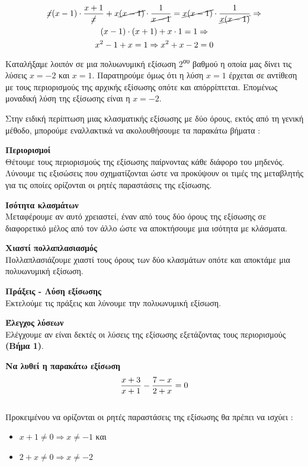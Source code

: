 \documentclass[twoside,nofonts,internet,methodoi]{thewria}
\DeclareRobustCommand{\frac}[3][0pt]{%
{\begingroup\hspace{#1}#2\hspace{#1}\endgroup\over\hspace{#1}#3\hspace{#1}}}
\newcommand{\tss}[1]{\textsuperscript{#1}}
\begin{document}
\begin{gather*}
\cancel{x}(x-1)\cdot\frac{x+1}{\cancel{x}}+x\cancel{(x-1)}\cdot\frac{1}{\cancel{x-1}}=\cancel{x(x-1)}\cdot\frac{1}{\cancel{x(x-1)}}\Rightarrow\\
(x-1)\cdot\left( x+1\right) +x\cdot 1=1\Rightarrow\\
x^2-1 +x=1\Rightarrow x^2+x-2=0
\end{gather*}
Καταλήξαμε λοιπόν σε μια πολυωνυμική εξίσωση 2\tss{ου} βαθμού η οποία μας δίνει τις λύσεις $ x=-2 $ και $ x=1 $. Παρατηρούμε όμως ότι η λύση $ x=1 $ έρχεται σε αντίθεση με τους περιορισμούς της αρχικής εξίσωσης οπότε και απόρρίπτεται. Επομένως μοναδική λύση της εξίσωσης είναι η $ x=-2 $. 
\begin{Methodos}
Στην ειδική περίπτωση μιας κλασματικής εξίσωσης με δύο όρους, εκτός από τη γενική μέθοδο, μπορούμε εναλλακτικά να ακολουθήσουμε τα παρακάτω βήματα :
\begin{bhma}
\item \textbf{Περιορισμοί}\\
Θέτουμε τους περιορισμούς της εξίσωσης παίρνοντας κάθε διάφορο του μηδενός. Λύνουμε τις εξισώσεις που σχηματίζονται ώστε να προκύψουν οι τιμές της μεταβλητής για τις οποίες ορίζονται οι ρητές παραστάσεις της εξίσωσης.
\item \textbf{Ισότητα κλασμάτων}\\
Μεταφέρουμε αν αυτό χρειαστεί, έναν από τους δύο όρους της εξίσωσης σε διαφορετικό μέλος από τον άλλο ώστε να αποκτήσουμε μια ισότητα με κλάσματα.
\item \textbf{Χιαστί πολλαπλασιασμός}\\
Πολλαπλασιάζουμε χιαστί τους όρους των δύο κλασμάτων οπότε και αποκτάμε μια πολυωνυμική εξίσωση.
\item \textbf{Πράξεις - Λύση εξίσωσης}\\
Εκτελούμε τις πράξεις και λύνουμε την πολυωνυμική εξίσωση.
\item \textbf{Έλεγχος λύσεων}\\
Ελέγχουμε αν είναι δεκτές οι λύσεις της εξίσωσης εξετάζοντας τους περιορισμούς \textbf{(Βήμα 1)}.
\end{bhma}
\end{Methodos}
\textbf{Να λυθεί η παρακάτω εξίσωση}
{\boldmath\[ \frac{x+3}{x+1}-\frac{7-x}{2+x}=0 \]}
\lysh\\
Προκειμένου να ορίζονται οι ρητές παραστάσεις της εξίσωσης θα πρέπει να ισχύει :
\begin{multicols}{2}
\begin{itemize}[itemsep=0mm]
\item $ x+1\neq0\Rightarrow x\neq-1 $ και
\item $ 2+x\neq0\Rightarrow x\neq-2 $
\end{itemize}
\end{multicols}
\end{document}
